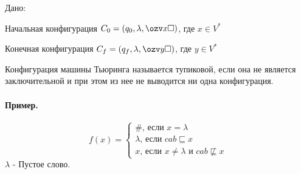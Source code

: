 
Дано:

Начальная конфигурация $C_0=(q_0,\lambda, \ozv x\square)$, где $x \in V^{*}$

Конечная конфигурация $C_{f} = (q_{f}, \lambda, \ozv y\square)$, где $y \in V^{*}$



\begin{definition}
Конфигурация машины Тьюринга называется тупиковой, если она не является заключительной и при этом из
нее не выводится ни одна конфигурация.
\end{definition}

\paragraph*{Пример.}
\[
f(x) = \begin{cases}
    \#\text{, если } x = \lambda \\
    \lambda\text{, если } cab \sqsubseteq x\\
    x\text{, если } x\neq \lambda\text{ и } cab \not\sqsubseteq x
\end{cases}
\]
$\lambda$ - Пустое слово.

